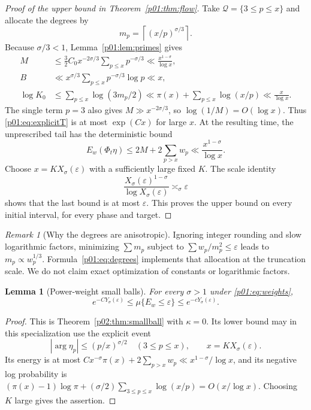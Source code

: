 \documentclass[11pt,letterpaper]{article}
\newtheorem{lemma}[theorem]{Lemma}
\theoremstyle{definition}
\theoremstyle{remark}
\newtheorem{remark}[theorem]{Remark}
\newcommand{\eps}{\varepsilon}
\newcommand{\1}{\mathbf 1}
\begin{document}
\begin{proof}[Proof of the upper bound in Theorem~\ref{p01:thm:flow}]
Take $\mathcal Q=\{3\le p\le x\}$ and allocate the degrees by
\begin{equation}\label{p01:eq:degrees}
 m_p=\left\lceil(x/p)^{\sigma/3}\right\rceil.
\end{equation}
Because $\sigma/3<1$, Lemma~\ref{p01:lem:primes} gives
\begin{align}
 M&\le\frac32C_0x^{-2\sigma/3}
                  \sum_{p\le x}p^{-\sigma/3}
       \ll\frac{x^{1-\sigma}}{\log x},\label{p01:eq:Mbound}\\
 B&\ll x^{\sigma/3}\sum_{p\le x}p^{-\sigma/3}\log p
       \ll x,\label{p01:eq:Bbound}\\
 \log K_0&\le\sum_{p\le x}\log(3m_p/2)
       \ll\pi(x)+\sum_{p\le x}\log(x/p)
       \ll\frac{x}{\log x}.\label{p01:eq:Kbound}
\end{align}
The single term $p=3$ also gives $M\gg x^{-2\sigma/3}$, so
$\log(1/M)=O(\log x)$. Thus \eqref{p01:eq:explicitT} is at most
$\exp(Cx)$ for large $x$. At the resulting time, the unprescribed tail
has the deterministic bound
\[
 E_w(\Phi_t\eta)
 \le 2M+2\sum_{p>x}w_p
 \ll\frac{x^{1-\sigma}}{\log x}.
\]
Choose $x=KX_\sigma(\eps)$ with a sufficiently large fixed $K$.
The scale identity
\begin{equation}\label{p01:eq:scaleid}
 \frac{X_\sigma(\eps)^{1-\sigma}}
      {\log X_\sigma(\eps)}\asymp_\sigma\eps
\end{equation}
shows that the last bound is at most $\eps$. This proves the upper
bound on every initial interval, for every phase and target.
\end{proof}

\begin{remark}[Why the degrees are anisotropic]
Ignoring integer rounding and slow logarithmic factors, minimizing
$\sum m_p$ subject to $\sum w_p/m_p^2\le\eps$ leads to
$m_p\propto w_p^{1/3}$. Formula~\eqref{p01:eq:degrees} implements that
allocation at the truncation scale. We do not claim exact optimization
of constants or logarithmic factors.
\end{remark}

\begin{lemma}[Power-weight small balls]\label{p01:lem:smallball}
For every $\sigma>1$ under \eqref{p01:eq:weights},
\[
 e^{-CY_\sigma(\eps)}\le\mu\{E_w\le\eps\}
 \le e^{-cY_\sigma(\eps)}.
\]
\end{lemma}
\begin{proof}
This is Theorem~\ref{p02:thm:smallball} with $\kappa=0$.
Its lower bound may in this specialization use the explicit event
\begin{equation}\label{p01:eq:boxevent}
 |\arg\eta_p|\le(p/x)^{\sigma/2}\quad(3\le p\le x),
 \qquad x=KX_\sigma(\eps).
\end{equation}
Its energy is at most
$C x^{-\sigma}\pi(x)+2\sum_{p>x}w_p\ll
x^{1-\sigma}/\log x$, and its negative log probability is
$(\pi(x)-1)\log\pi+(\sigma/2)\sum_{3\le p\le x}\log(x/p)
=O(x/\log x)$. Choosing $K$ large gives the assertion.
\end{proof}
\end{document}
